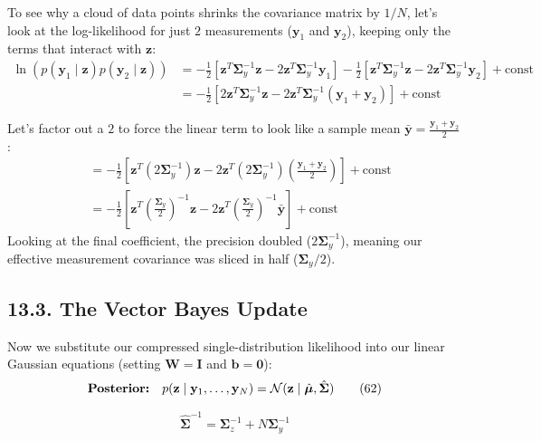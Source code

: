 \documentclass{article}
\begin{document}
To see why a cloud of data points shrinks the covariance matrix by $1/N$, let's look at the log-likelihood for just $2$ measurements ($\mathbf{y}_1$ and $\mathbf{y}_2$), keeping only the terms that interact with $\mathbf{z}$:
\begin{align*}
\ln\left(p(\mathbf{y}_1 \mid \mathbf{z})p(\mathbf{y}_2 \mid \mathbf{z})\right) &= -\frac{1}{2}\left[\mathbf{z}^T\boldsymbol{\Sigma}_y^{-1}\mathbf{z} - 2\mathbf{z}^T\boldsymbol{\Sigma}_y^{-1}\mathbf{y}_1\right] - \frac{1}{2}\left[\mathbf{z}^T\boldsymbol{\Sigma}_y^{-1}\mathbf{z} - 2\mathbf{z}^T\boldsymbol{\Sigma}_y^{-1}\mathbf{y}_2\right] + \text{const} \\
&= -\frac{1}{2}\left[ 2\mathbf{z}^T\boldsymbol{\Sigma}_y^{-1}\mathbf{z} - 2\mathbf{z}^T\boldsymbol{\Sigma}_y^{-1}(\mathbf{y}_1 + \mathbf{y}_2) \right] + \text{const}
\end{align*}

Let's factor out a $2$ to force the linear term to look like a sample mean $\bar{\mathbf{y}} = \frac{\mathbf{y}_1 + \mathbf{y}_2}{2}$:
\begin{align}
&= -\frac{1}{2}\left[ \mathbf{z}^T\left(2\boldsymbol{\Sigma}_y^{-1}\right)\mathbf{z} - 2\mathbf{z}^T\left(2\boldsymbol{\Sigma}_y^{-1}\right)\left(\frac{\mathbf{y}_1 + \mathbf{y}_2}{2}\right) \right] + \text{const} \tag{60} \\
&= -\frac{1}{2}\left[ \mathbf{z}^T\left(\frac{\boldsymbol{\Sigma}_y}{2}\right)^{-1}\mathbf{z} - 2\mathbf{z}^T\left(\frac{\boldsymbol{\Sigma}_y}{2}\right)^{-1}\bar{\mathbf{y}} \right] + \text{const} \tag{61}
\end{align}
Looking at the final coefficient, the precision doubled ($2\boldsymbol{\Sigma}_y^{-1}$), meaning our effective measurement covariance was sliced in half ($\boldsymbol{\Sigma}_y / 2$).

\subsection*{13.3. The Vector Bayes Update}
Now we substitute our compressed single-distribution likelihood into our linear Gaussian equations (setting $\mathbf{W} = \mathbf{I}$ and $\mathbf{b} = \mathbf{0}$):
\begin{equation}
\text{\textbf{Posterior:}} \quad p(\mathbf{z} \mid \mathbf{y}_1, \dots, \mathbf{y}_N) = \mathcal{N}(\mathbf{z} \mid \hat{\boldsymbol{\mu}}, \hat{\boldsymbol{\Sigma}}) \tag{62}
\end{equation}

\begin{equation}
\hat{\boldsymbol{\Sigma}}^{-1} = \boldsymbol{\Sigma}_z^{-1} + N\boldsymbol{\Sigma}_y^{-1} \tag{63}
\end{equation}
\end{document}
